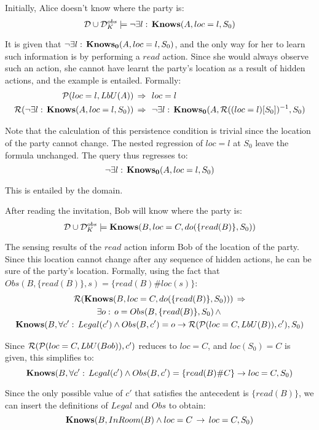 \begin{example}
Initially, Alice doesn't know where the party is:\[
\mathcal{D}\cup\mathcal{D}_{K}^{obs}\models\neg\exists l:\,\mathbf{Knows}(A,loc=l,S_{0})\]

\end{example}
It is given that $\neg\exists l:\,\mathbf{Knows_{0}}(A,loc=l,S_{0})$, and the
only way for her to learn such information is by performing a $read$
action. Since she would always observe such an action, she cannot
have learnt the party's location as a result of hidden actions, and
the example is entailed. Formally:\begin{align*}
\mathcal{P}(loc=l,LbU(A))\,\Rightarrow\,\,\,\, & loc=l\\
\mathcal{R}(\neg\exists l:\,\mathbf{Knows}(A,loc=l,S_{0}))\,\Rightarrow\,\,\,\, & \neg\exists l:\,\mathbf{Knows_{0}}(A,\mathcal{R}((loc=l)[S_{0}])^{-1},S_{0})\end{align*}


Note that the calculation of this persistence condition is trivial
since the location of the party cannot change. The nested regression
of $loc=l$ at $S_{0}$ leave the formula unchanged. The query thus
regresses to:\[
\neg\exists l:\,\mathbf{Knows_{0}}(A,loc=l,S_{0})\]


This is entailed by the domain.

\begin{example}
After reading the invitation, Bob will know where the party is:\[
\mathcal{D}\cup\mathcal{D}_{K}^{obs}\models\mathbf{Knows}(B,loc=C,do(\{read(B)\},S_{0}))\]

\end{example}
The sensing results of the $read$ action inform Bob of the location
of the party. Since this location cannot change after any sequence
of hidden actions, he can be sure of the party's location. Formally,
using the fact that $Obs(B,\{read(B)\},s)=\{read(B)\#loc(s)\}$:\begin{multline*}
\mathcal{R}(\mathbf{Knows}(B,loc=C,do(\{read(B)\},S_{0})))\,\Rightarrow\\
\exists o:\, o=Obs(B,\{read(B)\},S_{0})\,\wedge\,\\
\mathbf{Knows}(B,\forall c':\, Legal(c')\wedge Obs(B,c')=o\rightarrow\mathcal{R}(\mathcal{P}(loc=C,LbU(B)),c'),S_{0})\end{multline*}


Since $\mathcal{R}(\mathcal{P}(loc=C,LbU(Bob)),c')$ reduces to $loc=C$, and $loc(S_{0})=C$
is given, this simplifies to:\[
\mathbf{Knows}(B,\forall c':\, Legal(c')\wedge Obs(B,c')=\{read(B)\#C\}\rightarrow loc=C,S_{0})\]


Since the only possible value of $c'$ that satisfies the antecedent
is $\{read(B)\}$, we can insert the definitions of $Legal$ and $Obs$
to obtain:\[
\mathbf{Knows}(B,InRoom(B)\wedge loc=C\,\rightarrow\, loc=C,S_{0})\]


